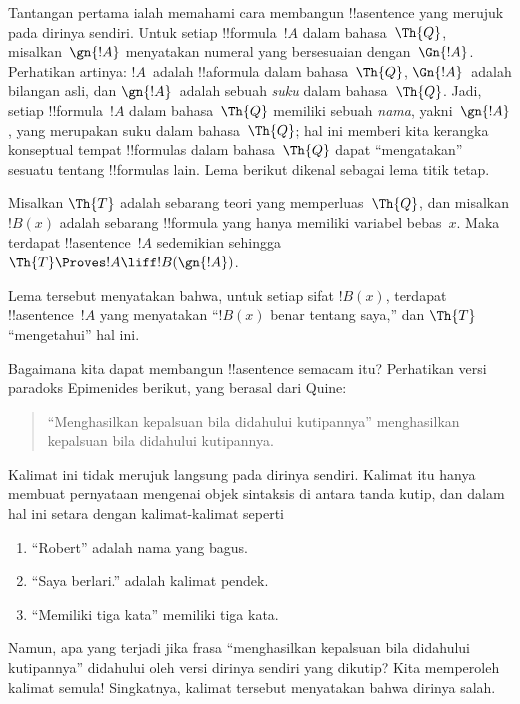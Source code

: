 \documentclass[../../../include/open-logic-section]{subfiles}
\begin{document}
Tantangan pertama ialah memahami cara membangun !!a{sentence} yang merujuk
pada dirinya sendiri. Untuk setiap !!{formula}~$!A$ dalam bahasa~$\Th{Q}$,
misalkan~$\gn{!A}$ menyatakan numeral yang bersesuaian dengan~$\Gn{!A}$.
Perhatikan artinya: $!A$~adalah !!a{formula} dalam bahasa~$\Th{Q}$,
$\Gn{!A}$~adalah bilangan asli, dan $\gn{!A}$~adalah sebuah \emph{suku}
dalam bahasa~$\Th{Q}$. Jadi, setiap !!{formula}~$!A$ dalam bahasa~$\Th{Q}$
memiliki sebuah \emph{nama}, yakni~$\gn{!A}$, yang merupakan suku dalam
bahasa~$\Th{Q}$; hal ini memberi kita kerangka konseptual tempat
!!{formula}s dalam bahasa~$\Th{Q}$ dapat ``mengatakan'' sesuatu tentang
!!{formula}s lain. Lema berikut dikenal sebagai lema titik tetap.

\begin{lem}
Misalkan $\Th{T}$ adalah sebarang teori yang memperluas~$\Th{Q}$, dan
misalkan $!B(x)$ adalah sebarang !!{formula} yang hanya memiliki variabel
bebas~$x$. Maka terdapat !!a{sentence}~$!A$ sedemikian sehingga $\Th{T}
\Proves!A \liff !B(\gn{!A})$.
\end{lem}

Lema tersebut menyatakan bahwa, untuk setiap sifat $!B(x)$, terdapat
!!a{sentence}~$!A$ yang menyatakan ``$!B(x)$ benar tentang saya,'' dan
$\Th{T}$ ``mengetahui'' hal ini.

Bagaimana kita dapat membangun !!a{sentence} semacam itu? Perhatikan versi
paradoks Epimenides berikut, yang berasal dari Quine:
\begin{quote}
``Menghasilkan kepalsuan bila didahului kutipannya'' menghasilkan kepalsuan
bila didahului kutipannya.
\end{quote}
Kalimat ini tidak merujuk langsung pada dirinya sendiri. Kalimat itu hanya
membuat pernyataan mengenai objek sintaksis di antara tanda kutip, dan dalam
hal ini setara dengan kalimat-kalimat seperti
\begin{enumerate}
\item ``Robert'' adalah nama yang bagus.
\item ``Saya berlari.'' adalah kalimat pendek.
\item ``Memiliki tiga kata'' memiliki tiga kata.
\end{enumerate}
Namun, apa yang terjadi jika frasa ``menghasilkan kepalsuan bila didahului
kutipannya'' didahului oleh versi dirinya sendiri yang dikutip? Kita
memperoleh kalimat semula!{} Singkatnya, kalimat tersebut menyatakan bahwa
dirinya salah.
\end{document}
